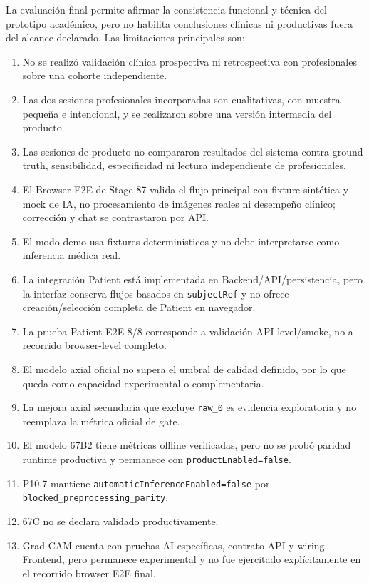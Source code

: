 La evaluación final permite afirmar la consistencia funcional y técnica del prototipo académico, pero no habilita conclusiones clínicas ni productivas fuera del alcance declarado. Las limitaciones principales son:
\begin{enumerate}
    \item No se realizó validación clínica prospectiva ni retrospectiva con profesionales sobre una cohorte independiente.
    \item Las dos sesiones profesionales incorporadas son cualitativas, con muestra pequeña e intencional, y se realizaron sobre una versión intermedia del producto.
    \item Las sesiones de producto no compararon resultados del sistema contra ground truth, sensibilidad, especificidad ni lectura independiente de profesionales.
    \item El Browser E2E de Stage 87 valida el flujo principal con fixture sintética y mock de IA, no procesamiento de imágenes reales ni desempeño clínico; corrección y chat se contrastaron por API.
    \item El modo demo usa fixtures determinísticos y no debe interpretarse como inferencia médica real.
    \item La integración Patient está implementada en Backend/API/persistencia, pero la interfaz conserva flujos basados en \texttt{subjectRef} y no ofrece creación/selección completa de Patient en navegador.
    \item La prueba Patient E2E 8/8 corresponde a validación API-level/smoke, no a recorrido browser-level completo.
    \item El modelo axial oficial no supera el umbral de calidad definido, por lo que queda como capacidad experimental o complementaria.
    \item La mejora axial secundaria que excluye \texttt{raw\_0} es evidencia exploratoria y no reemplaza la métrica oficial de gate.
    \item El modelo 67B2 tiene métricas offline verificadas, pero no se probó paridad runtime productiva y permanece con \texttt{productEnabled=false}.
    \item P10.7 mantiene \texttt{automaticInferenceEnabled=false} por \texttt{blocked\_preprocessing\_parity}.
    \item 67C no se declara validado productivamente.
    \item Grad-CAM cuenta con pruebas AI específicas, contrato API y wiring Frontend, pero permanece experimental y no fue ejercitado explícitamente en el recorrido browser E2E final.

\end{enumerate}
